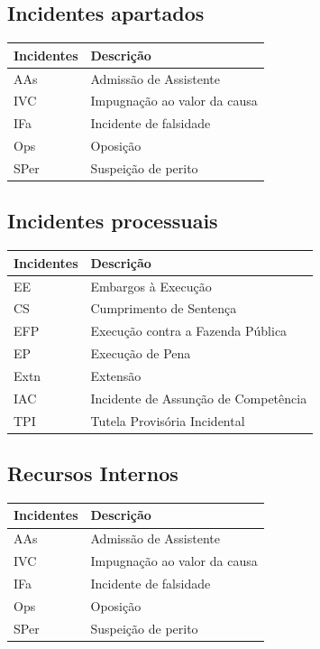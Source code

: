 \documentclass[
]{book}
\begin{document}
\hypertarget{incidentes-apartados}{%
\subsection{Incidentes apartados}\label{incidentes-apartados}}

\begin{tabular}{l|l}
\hline
Incidentes & Descrição\\
\hline
AAs & Admissão de Assistente\\
\hline
IVC & Impugnação ao valor da causa\\
\hline
IFa & Incidente de falsidade\\
\hline
Ops & Oposição\\
\hline
SPer & Suspeição de perito\\
\hline
\end{tabular}

\hypertarget{incidentes-processuais}{%
\subsection{Incidentes processuais}\label{incidentes-processuais}}

\begin{tabular}{l|l}
\hline
Incidentes & Descrição\\
\hline
EE & Embargos à Execução\\
\hline
CS & Cumprimento de Sentença\\
\hline
EFP & Execução contra a Fazenda Pública\\
\hline
EP & Execução de Pena\\
\hline
Extn & Extensão\\
\hline
IAC & Incidente de Assunção de Competência\\
\hline
TPI & Tutela Provisória Incidental\\
\hline
\end{tabular}

\hypertarget{recursos-internos}{%
\subsection{Recursos Internos}\label{recursos-internos}}

\begin{tabular}{l|l}
\hline
Incidentes & Descrição\\
\hline
AAs & Admissão de Assistente\\
\hline
IVC & Impugnação ao valor da causa\\
\hline
IFa & Incidente de falsidade\\
\hline
Ops & Oposição\\
\hline
SPer & Suspeição de perito\\
\hline
\end{tabular}
\end{document}
